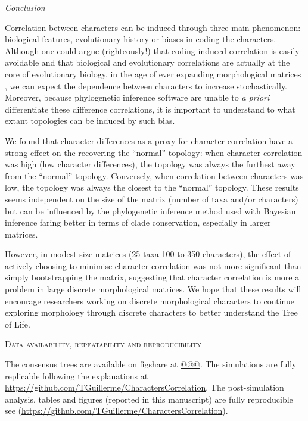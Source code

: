 \documentclass[12pt,letterpaper]{article}
\renewcommand{\section}[1]{%
\bigskip
\begin{center}
\begin{Large}
\normalfont\scshape #1
\medskip
\end{Large}
\end{center}}
\renewcommand{\subsection}[1]{%
\bigskip
\begin{center}
\begin{large}
\normalfont\itshape #1
\end{large}
\end{center}}
\begin{document}
\subsection{Conclusion}
Correlation between characters can be induced through three main phenomenon: biological features, evolutionary history or biases in coding the characters.
Although one could argue (righteously!) that coding induced correlation is easily avoidable and that biological and evolutionary correlations are actually at the core of evolutionary biology, in the age of ever expanding morphological matrices \citep[e.g.][with more than 1000 characters each]{nithe2013,O'Leary08022013}, we can expect the dependence between characters to increase stochastically.
Moreover, because phylogenetic inference software are unable to \textit{a priori} differentiate these difference correlations, it is important to understand to what extant topologies can be induced by such bias.

We found that character differences as a proxy for character correlation have a strong effect on the recovering the ``normal'' topology: when character correlation was high (low character differences), the topology was always the furthest away from the ``normal'' topology.
Conversely, when correlation between characters was low, the topology was always the closest to the ``normal'' topology.
These results seems independent on the size of the matrix (number of taxa and/or characters) but can be influenced by the phylogenetic inference method used with Bayesian inference faring better in terms of clade conservation, especially in larger matrices.

However, in modest size matrices (25 taxa 100 to 350 characters), the effect of actively choosing to minimise character correlation was not more significant than simply bootstrapping the matrix, suggesting that character correlation is more a problem in large discrete morphological matrices.
We hope that these results will encourage researchers working on discrete morphological characters to continue exploring morphology through discrete characters to better understand the Tree of Life.

\section{Data availability, repeatability and reproducibility}
The consensus trees are available on figshare at \url{@@@}.
The simulations are fully replicable following the explanations at \url{https://github.com/TGuillerme/CharactersCorrelation}.
The post-simulation analysis, tables and figures (reported in this manuscript) are fully reproducible see (\url{https://github.com/TGuillerme/CharactersCorrelation}).
\end{document}
